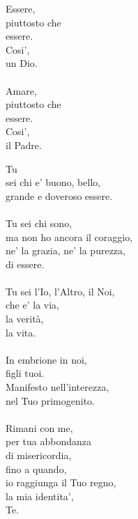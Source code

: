 \begin{haiku}
    Essere,\\
    piuttosto che\\
    essere.\\
    Cosi',\\
    un Dio.\\
    \leavevmode\\
    Amare,\\
    piuttosto che\\
    essere.\\
    Cosi',\\
    il Padre.\\

\end{haiku}

\begin{haiku}
    Tu\\
    sei chi e' buono, bello,\\
    grande e doveroso essere.\\
    \leavevmode\\
    Tu sei chi sono,\\
    ma non ho ancora il coraggio,\\
    ne' la grazia, ne' la purezza,\\
    di essere.\\
    \leavevmode\\
    Tu sei l'Io, l'Altro, il Noi,\\
    che e' la via,\\
    la verità,\\ 
    la vita.\\
    \leavevmode\\
    In embrione in noi, \\
    figli tuoi.\\
    Manifesto nell'interezza,\\
    nel Tuo primogenito.\\
    \leavevmode\\
    Rimani con me,\\
    per tua abbondanza \\
    di misericordia,\\
    fino a quando,\\
    io raggiunga il Tuo regno,\\
    la mia identita',\\
    Te.\\
\end{haiku}


